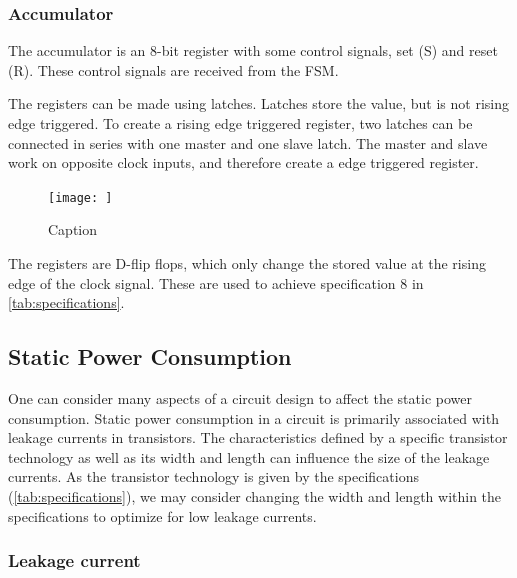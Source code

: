 \subsubsection{Accumulator}
The accumulator is an 8-bit register with some control signals, set (S) and reset (R). These control signals are received from the FSM. 

The registers can be made using latches. Latches store the value, but is not rising edge triggered. To create a rising edge triggered register, two latches can be connected in series with one master and one slave latch. The master and slave work on opposite clock inputs, and therefore create a edge triggered register. 

\begin{figure}
    \centering
    \texttt{[image: ]}
    \caption{Caption}
    \label{fig:enter-label}
\end{figure}


The registers are D-flip flops, which only change the stored value at the rising edge of the clock signal. These are used to achieve specification 8 in \autoref{tab:specifications}. 



\subsection{Static Power Consumption}
\label{subsec:low_power}

One can consider many aspects of a circuit design to affect the static power consumption. Static power consumption in a circuit is primarily associated with leakage currents in transistors. The characteristics defined by a specific transistor technology as well as its width and length can influence the size of the leakage currents. As the transistor technology is given by the specifications (\ref{tab:specifications}), we may consider changing the width and length within the specifications to optimize for low leakage currents. 

\subsubsection{Leakage current}

